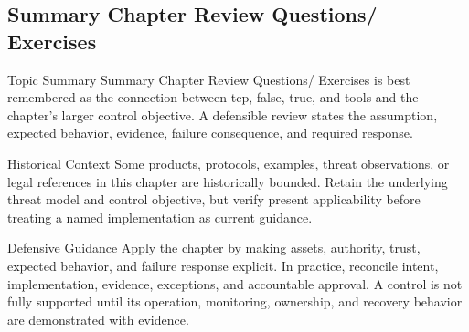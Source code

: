 \documentclass[11pt,letterpaper]{article}
\begin{document}
\subsection*{Summary Chapter Review Questions/ Exercises}
\begin{CornellNotesTable}
\end{CornellNotesTable}
\begin{CornellSummaryBox}{Topic Summary}
Summary Chapter Review Questions/ Exercises is best remembered as the connection between tcp, false, true, and tools and the chapter's larger control objective. A defensible review states the assumption, expected behavior, evidence, failure consequence, and required response.
\end{CornellSummaryBox}
\begin{CornellWarningBox}{Historical Context}
Some products, protocols, examples, threat observations, or legal references in this chapter are historically bounded. Retain the underlying threat model and control objective, but verify present applicability before treating a named implementation as current guidance.
\end{CornellWarningBox}
\begin{CornellOverviewBox}{Defensive Guidance}
Apply the chapter by making assets, authority, trust, expected behavior, and failure response explicit. In practice, reconcile intent, implementation, evidence, exceptions, and accountable approval. A control is not fully supported until its operation, monitoring, ownership, and recovery behavior are demonstrated with evidence.
\end{CornellOverviewBox}
\end{document}
